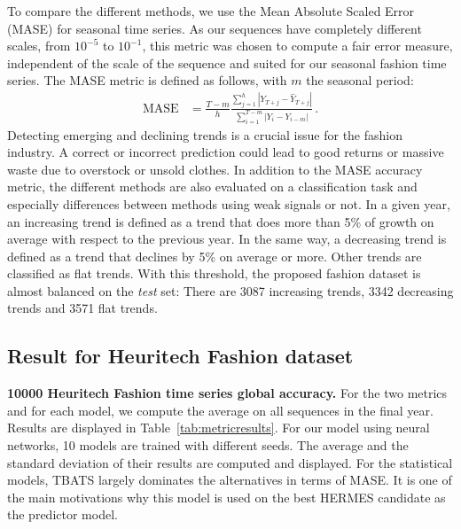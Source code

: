 \documentclass[review]{elsarticle}
\begin{document}
To compare the different methods, we use the Mean Absolute Scaled Error (MASE) for seasonal time series. As our sequences have completely different scales, from $10^{-5}$ to $10^{-1}$, this metric was chosen to compute a fair error measure, independent of the scale of the sequence and suited for our seasonal fashion time series. The MASE metric is defined as follows, with $m$ the seasonal period:
\begin{align*}
\mathrm{MASE} &= \frac{T-m}{h}\frac{\sum_{j=1}^h |Y_{T+j} - \hat{Y}_{T+j}| }{\sum_{i=1}^{T-m} |Y_i - Y_{i-m}|}\,.
\end{align*}
Detecting emerging and declining trends is a crucial issue for the fashion industry. A correct or incorrect prediction could lead to good returns or massive waste due to overstock or unsold clothes. In addition to the MASE accuracy metric, the different methods are also evaluated on a classification task and especially differences between methods using weak signals or not. In a given year, an increasing trend is defined as a trend that does more than 5\% of growth on average with respect to the previous year. In the same way, a decreasing trend is defined as a trend that declines by 5\% on average or more. Other trends are classified as flat trends. With this threshold, the proposed fashion dataset is almost balanced on the {\em test} set: There are 3087 increasing trends, 3342 decreasing trends and 3571 flat trends.


\subsection{Result for Heuritech Fashion dataset}

\textbf{10000 Heuritech Fashion time series global accuracy. }For the two metrics and for each model, we compute the average on all sequences in the final year. Results are displayed in Table~\ref{tab:metricresults}. For our model using neural networks, 10 models are trained  with different seeds. The average and the standard deviation of their results are computed and displayed. For the statistical models, TBATS largely dominates the alternatives  in terms of MASE. It is one of the main motivations why this model is used on the best HERMES candidate as the predictor model. 
\end{document}
